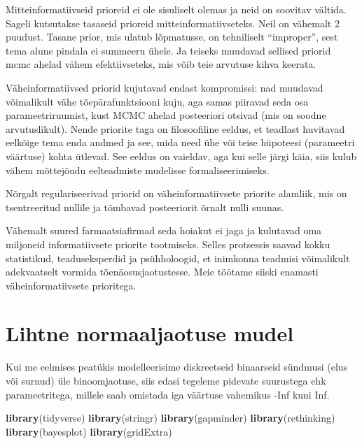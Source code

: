 \documentclass[]{book}
\newenvironment{Shaded}{\begin{snugshade}}{\end{snugshade}}
\newcommand{\KeywordTok}[1]{\textcolor[rgb]{0.13,0.29,0.53}{\textbf{#1}}}
\newcommand{\NormalTok}[1]{#1}
\begin{document}
Mitteinformatiivseid prioreid ei ole sisuliselt olemas ja neid on
soovitav vältida. Sageli kutsutakse tasaseid prioreid
mitteinformatiivseteks. Neil on vähemalt 2 puudust. Tasane prior, mis
ulatub lõpmatusse, on tehniliselt ``improper'', sest tema alune pindala
ei summeeru ühele. Ja teiseks muudavad sellised priorid mcmc ahelad
vähem efektiivseteks, mis võib teie arvutuse kihva keerata.

Väheinformatiivsed priorid kujutavad endast kompromissi: nad muudavad
võimalikult vähe tõepärafunktsiooni kuju, aga samas piiravad seda osa
parameetriruumist, kust MCMC ahelad posteeriori otsivad (mis on soodne
arvutuslikult). Nende priorite taga on filosoofiline eeldus, et teadlast
huvitavad eelkõige tema enda andmed ja see, mida need ühe või teise
hüpoteesi (parameetri väärtuse) kohta ütlevad. See eeldus on vaieldav,
aga kui selle järgi käia, siis kulub vähem mõttejõudu eelteadmiste
mudelisse formaliseerimiseks.

Nõrgalt regulariseerivad priorid on väheinformatiivsete priorite
alamliik, mis on tsentreeritud nullile ja tõmbavad posteeriorit õrnalt
nulli suunas.

Vähemalt suured farmaatsiafirmad seda hoiakut ei jaga ja kulutavad oma
miljoneid informatiivsete priorite tootmiseks. Selles protsessis saavad
kokku statistikud, teaduseksperdid ja psühholoogid, et inimkonna
teadmisi võimalikult adekvaatselt vormida tõenäosusjaotustesse. Meie
töötame siiski enamasti väheinformatiivsete prioritega.

\chapter{Lihtne normaaljaotuse mudel}\label{lihtne-normaaljaotuse-mudel}

Kui me eelmises peatükis modelleerisime diskreetseid binaarseid sündmusi
(elus või surnud) üle binoomjaotuse, siis edasi tegeleme pidevate
suurustega ehk parameetritega, millele saab omistada iga väärtuse
vahemikus -Inf kuni Inf.

\begin{Shaded}
\begin{Highlighting}[]
\KeywordTok{library}\NormalTok{(tidyverse)}
\KeywordTok{library}\NormalTok{(stringr)}
\KeywordTok{library}\NormalTok{(gapminder)}
\KeywordTok{library}\NormalTok{(rethinking)}
\KeywordTok{library}\NormalTok{(bayesplot)}
\KeywordTok{library}\NormalTok{(gridExtra)}
\end{Highlighting}
\end{Shaded}
\end{document}
